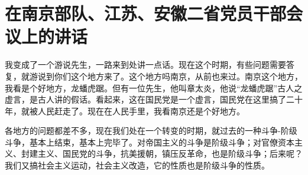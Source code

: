 \section[在南京部队、江苏、安徽二省党员干部会议上的讲话（一九五七年三月二十日）]{在南京部队、江苏、安徽二省党员干部会议上的讲话}


我变成了一个游说先生，一路来到处讲一点话。现在这个时期，有些问题需要答复，就游说到你们这个地方来了。这个地方吗南京，从前也来过。南京这个地方，我看是个好地方，龙蟠虎踞。但有一位先生，他叫章太炎，他说“龙蟠虎踞”古人之虚言，是古人讲的假话。看起来，这在国民党是一个虚言，国民党在这里搞了二十年，就被人民赶走了。现在在人民手里，我看南京还是个好地方。

各地方的问题都差不多，现在我们处在一个转变的时期，就过去的一种斗争-阶级斗争，基本上结束，基本上完毕了。对帝国主义的斗争是阶级斗争；对官僚资本主义、封建主义、国民党的斗争，抗美援朝，镇压反革命，也是阶级斗争；后来呢？我们又搞社会主义运动，社会主义改造，它的性质也是阶级斗争的性质。

